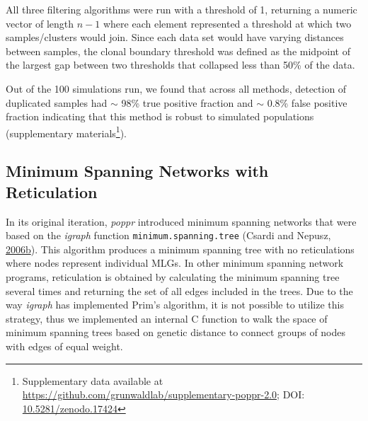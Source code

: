 \documentclass[double,12pt]{beavtex}
\begin{document}
  All three filtering algorithms were run with a threshold of 1, returning
  a numeric vector of length \(n - 1\) where each element represented a
  threshold at which two samples/clusters would join. Since each data set
  would have varying distances between samples, the clonal boundary
  threshold was defined as the midpoint of the largest gap between two
  thresholds that collapsed less than 50\% of the data.
  
  Out of the 100 simulations run, we found that across all methods,
  detection of duplicated samples had \(\sim\) 98\% true positive fraction
  and \(\sim\) 0.8\% false positive fraction indicating that this method
  is robust to simulated populations (supplementary materials\footnote{Supplementary
    data available at
    \url{https://github.com/grunwaldlab/supplementary-poppr-2.0}; DOI:
    \href{http://dx.doi.org/10.5281/zenodo.17424}{10.5281/zenodo.17424}}).
  
  \subsection{Minimum Spanning Networks with
  Reticulation}\label{minimum-spanning-networks-with-reticulation}
  
  In its original iteration, \emph{poppr} introduced minimum spanning
  networks that were based on the \emph{igraph} function
  \texttt{minimum.spanning.tree} (Csardi and Nepusz,
  \protect\hyperlink{ref-csardi2006igraph}{2006}\protect\hyperlink{ref-csardi2006igraph}{b}).
  This algorithm produces a minimum spanning tree with no reticulations
  where nodes represent individual MLGs. In other minimum spanning network
  programs, reticulation is obtained by calculating the minimum spanning
  tree several times and returning the set of all edges included in the
  trees. Due to the way \emph{igraph} has implemented Prim's algorithm, it
  is not possible to utilize this strategy, thus we implemented an
  internal C function to walk the space of minimum spanning trees based on
  genetic distance to connect groups of nodes with edges of equal weight.
  
\end{document}
